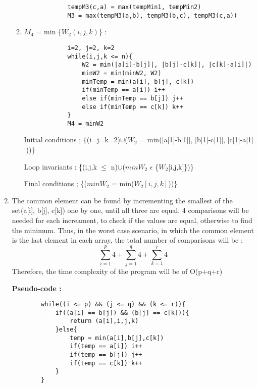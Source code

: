 \documentclass[12pt]{article}
\begin{document}
\begin{enumerate}
\begin{enumerate}
\begin{verbatim}
            tempM3(c,a) = max(tempMin1, tempMin2)
            M3 = max(tempM3(a,b), tempM3(b,c), tempM3(c,a))
        \end{verbatim}
        \item $M_4$ = min \{$W_2(i,j,k)$\} : 
        \begin{verbatim}
            i=2, j=2, k=2
            while(i,j,k <= n){
                W2 = min(|a[i]-b[j]|, |b[j]-c[k]|, |c[k]-a[i]|)
                minW2 = min(minW2, W2)
                minTemp = min(a[i], b[j], c[k])
                if(minTemp == a[i]) i++
                else if(minTemp == b[j]) j++
                else if(minTemp == c[k]) k++
            }
            M4 = minW2
        \end{verbatim}
        Initial conditions ; \{(i=j=k=2)$\cup$($W_2$ = min($|$a[1]-b[1]$|$, $|$b[1]-c[1]$|$, $|$c[1]-a[1]$|$))\}
        
        Loop invariants : \{(i,j,k $\leq$ n)$\cup$($minW_2$ $\epsilon$ \{$W_2$[i,j,k]\})\}
        
        Final conditions ; \{($minW_2$ = min($W_2[i,j,k]$))\}
    \end{enumerate}
    \item
    The common element can be found by incrementing the smallest of the set(a[i], b[j], c[k]) one by one, until all three are equal. 4 comparisons will be needed for each increament, to check if the values are equal, otherwise to find the minimum. Thus, in the worst case scenario, in which the common element is the last element in each array, the total number of comparisons will be :
    \[ \sum_{i=1}^{p}4 +  \sum_{j=1}^{q}4 + \sum_{k=1}^{r}4\]
    Therefore, the time complexity of the program will be of O(p+q+r)
    
    \textbf{Pseudo-code :}
    \begin{verbatim}
        while((i <= p) && (j <= q) && (k <= r)){
            if((a[i] == b[j]) && (b[j] == c[k])){
                return (a[i],i,j,k)
            }else{
                temp = min(a[i],b[j],c[k])
                if(temp == a[i]) i++
                if(temp == b[j]) j++
                if(temp == c[k]) k++
            }
        }
    \end{verbatim}
    

\end{enumerate}
\end{document}
